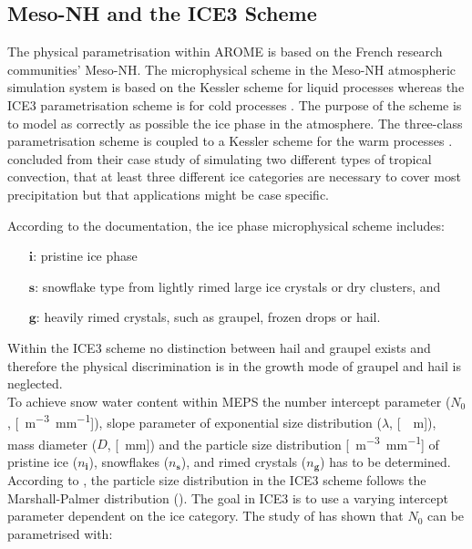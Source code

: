 \subsection{Meso-NH and the ICE3 Scheme} \label{sec:MesoNH}
The physical parametrisation within AROME is based on the French research communities' Meso-NH. The microphysical scheme in the Meso-NH atmospheric simulation system is based on the Kessler scheme for liquid processes whereas the ICE3 parametrisation scheme is for cold processes \citep{meteo_france_meso-nh_2009}. The purpose of the scheme is to model as correctly as possible the ice phase in the atmosphere. The three-class parametrisation scheme is coupled to a Kessler scheme for the warm processes \citep{pinty_mixed-phased_1998}. \cite{mccumber_comparison_1991} concluded from their case study of simulating two different types of tropical convection, that at least three different ice categories are necessary to cover most precipitation but that applications might be case specific. 
\par\medskip\noindent
According to the \cite{meteo_france_meso-nh_2009} documentation, the ice phase microphysical scheme includes: 
\begin{itemize}
	\item [$\mathbf{i}$:] pristine ice phase  
	\item [$\mathbf{s}$:] snowflake type from lightly rimed large ice crystals or dry clusters, and
	\item [$\mathbf{g}$:] heavily rimed crystals, such as graupel, frozen drops or hail.
\end{itemize}
Within the ICE3 scheme no distinction between hail and graupel exists and therefore the physical discrimination is in the growth mode of graupel and hail is neglected. \\
To achieve snow water content within MEPS the number intercept parameter ($N_0$, [\SI{}{\metre^{-3}\per\mm}]), slope parameter of exponential size distribution ($\lambda$, [\SI{}{\per\metre}]), mass diameter ($D$, [\SI{}{\mm}]) and  the particle size distribution [\SI{}{\metre^{-3}\per\mm}] of pristine ice ($n_\mathbf{i}$), snowflakes ($n_\mathbf{s}$), and rimed crystals ($n_\mathbf{g}$)  has to be determined. 
According to \cite{caniaux_numerical_1994}, the particle size distribution in the ICE3 scheme follows the Marshall-Palmer distribution (). The goal in ICE3 is to use a varying intercept parameter dependent on the ice category. The study of \citet{caniaux_numerical_1994} has shown that $N_0$ can be parametrised with:
